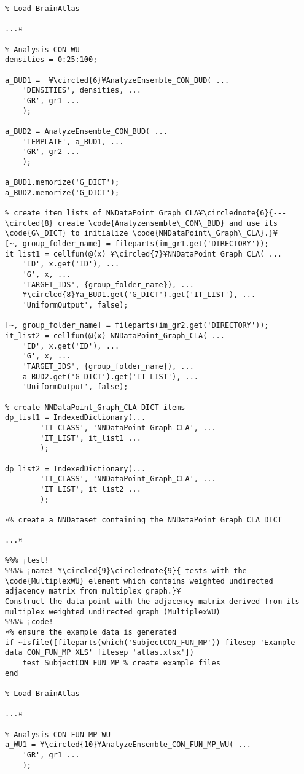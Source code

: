 \documentclass{tufte-handout}
\begin{document}
\begin{lstlisting}
% Load BrainAtlas

...¤

% Analysis CON WU
densities = 0:25:100;

a_BUD1 =  ¥\circled{6}¥AnalyzeEnsemble_CON_BUD( ...
    'DENSITIES', densities, ...
    'GR', gr1 ...
    );

a_BUD2 = AnalyzeEnsemble_CON_BUD( ...
    'TEMPLATE', a_BUD1, ...
    'GR', gr2 ...
    );

a_BUD1.memorize('G_DICT');
a_BUD2.memorize('G_DICT');

% create item lists of NNDataPoint_Graph_CLA¥\circlednote{6}{---\circled{8} create \code{Analyzensemble\_CON\_BUD} and use its \code{G\_DICT} to initialize \code{NNDataPoint\_Graph\_CLA}.}¥
[~, group_folder_name] = fileparts(im_gr1.get('DIRECTORY'));
it_list1 = cellfun(@(x) ¥\circled{7}¥NNDataPoint_Graph_CLA( ...
    'ID', x.get('ID'), ...
    'G', x, ...
    'TARGET_IDS', {group_folder_name}), ...
    ¥\circled{8}¥a_BUD1.get('G_DICT').get('IT_LIST'), ...
    'UniformOutput', false);

[~, group_folder_name] = fileparts(im_gr2.get('DIRECTORY'));
it_list2 = cellfun(@(x) NNDataPoint_Graph_CLA( ...
    'ID', x.get('ID'), ...
    'G', x, ...
    'TARGET_IDS', {group_folder_name}), ...
    a_BUD2.get('G_DICT').get('IT_LIST'), ...
    'UniformOutput', false);

% create NNDataPoint_Graph_CLA DICT items
dp_list1 = IndexedDictionary(...
        'IT_CLASS', 'NNDataPoint_Graph_CLA', ...
        'IT_LIST', it_list1 ...
        );

dp_list2 = IndexedDictionary(...
        'IT_CLASS', 'NNDataPoint_Graph_CLA', ...
        'IT_LIST', it_list2 ...
        );

¤% create a NNDataset containing the NNDataPoint_Graph_CLA DICT

...¤

%%% ¡test!
%%%% ¡name! ¥\circled{9}\circlednote{9}{ tests with the \code{MultiplexWU} element which contains weighted undirected adjacency matrix from multiplex graph.}¥
Construct the data point with the adjacency matrix derived from its multiplex weighted undirected graph (MultiplexWU) 
%%%% ¡code!
¤% ensure the example data is generated
if ~isfile([fileparts(which('SubjectCON_FUN_MP')) filesep 'Example data CON_FUN_MP XLS' filesep 'atlas.xlsx'])
    test_SubjectCON_FUN_MP % create example files
end

% Load BrainAtlas

...¤

% Analysis CON FUN MP WU
a_WU1 = ¥\circled{10}¥AnalyzeEnsemble_CON_FUN_MP_WU( ...
    'GR', gr1 ...
    );


\end{lstlisting}
\end{document}
